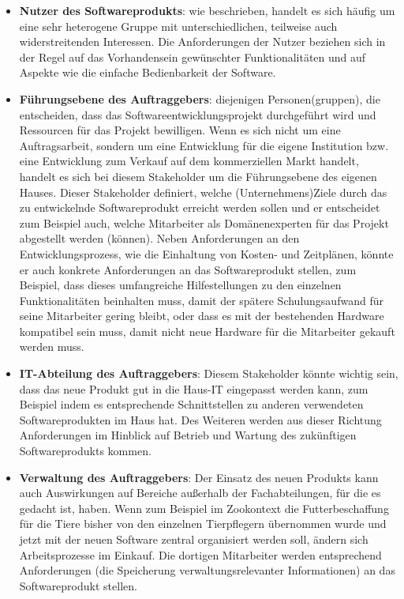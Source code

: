 \begin{itemize}
	\setlength{\itemsep}{0.4mm} %
	
	\item \textbf{Nutzer des Softwareprodukts}: wie beschrieben, handelt es sich häufig um eine sehr heterogene Gruppe mit unterschiedlichen, teilweise auch wider\-streitenden Interessen. Die Anforderungen der Nutzer beziehen sich in der Regel auf das Vorhandensein gewünschter Funktionalitäten und auf Aspekte wie die einfache Bedienbarkeit der Software.
	\item \textbf{Führungsebene des Auftraggebers}: diejenigen Personen(gruppen), die entscheiden, dass das Softwareentwicklungsprojekt durchgeführt wird und Ressourcen für das Projekt bewilligen. Wenn es sich nicht um eine Auftragsarbeit, sondern um eine Entwicklung für die eigene Institution bzw. eine Entwicklung zum Verkauf auf dem kommerziellen Markt handelt, handelt es sich bei diesem Stakeholder um die Führungsebene des eigenen Hauses. Dieser Stakeholder definiert, welche (Unternehmens)Ziele durch das zu entwickelnde Softwareprodukt erreicht werden sollen und er entscheidet zum Beispiel auch, welche Mitarbeiter als Domänenexperten für das Projekt abgestellt werden (können). Neben Anforderungen an den Entwicklungsprozess, wie die Einhaltung von Kosten- und Zeitplänen, könnte er auch konkrete Anforderungen an das Softwareprodukt stellen, zum Beispiel, dass dieses umfangreiche Hilfestellungen zu den einzelnen Funktionalitäten beinhalten muss, damit der spätere Schulungsaufwand für seine Mitarbeiter gering bleibt, oder dass es mit der bestehenden Hardware kompatibel sein muss, damit nicht neue Hardware für die Mitarbeiter gekauft werden muss.
	\item \textbf{IT-Abteilung des Auftraggebers}: Diesem Stakeholder könnte wichtig sein, dass das neue Produkt gut in die Haus-IT eingepasst werden kann, zum Beispiel indem es entsprechende Schnittstellen zu anderen verwendeten Softwareprodukten im Haus hat. Des Weiteren werden aus dieser Richtung Anforderungen im Hinblick auf Betrieb und Wartung des zukünftigen Softwareprodukts kommen.
	\item \textbf{Verwaltung des Auftraggebers}: Der Einsatz des neuen Produkts kann auch Auswirkungen auf Bereiche außerhalb der Fachabteilungen, für die es gedacht ist, haben. Wenn zum Beispiel im Zookontext die Futterbeschaffung für die
	\linebreak %
	Tiere bisher von den einzelnen Tierpflegern übernommen wurde und jetzt mit der neuen Software zentral organisiert werden soll, ändern sich Arbeits\-prozesse im Einkauf. Die dortigen Mitarbeiter werden entsprechend Anforderungen (\zb die Speicherung verwaltungsrelevanter Informationen) an das Softwareprodukt stellen.

\end{itemize}
